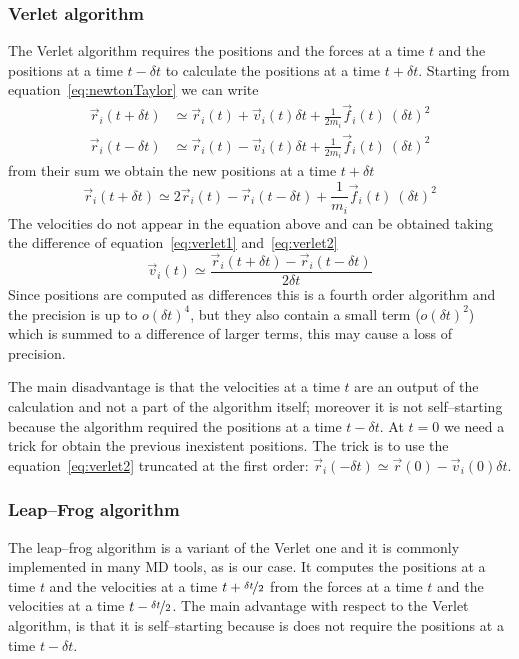 \subsubsection{Verlet algorithm}
The Verlet algorithm requires the positions and the forces at a time $t$ and the positions at a time $t-\delta t$ to calculate the  positions at a time $t+\delta t$. Starting from equation~\eqref{eq:newtonTaylor} we can write
\begin{align}
	\vec r_i(t+\delta t) &\simeq \vec r_i(t) + \vec v_i(t)\delta t + \frac{1}{2m_i}\vec f_i(t)\ (\delta t)^2
	\label{eq:verlet1} \\
	\vec r_i(t-\delta t) &\simeq \vec r_i(t) - \vec v_i(t)\delta t + \frac{1}{2m_i}\vec f_i(t)\ (\delta t)^2
	\label{eq:verlet2}
\end{align}
from their sum we obtain the new positions at a time $t+\delta t$
\begin{equation*}
	\vec r_i(t+\delta t) \simeq 2 \vec r_i(t) - \vec r_i (t - \delta t) + \frac{1}{m_i}\vec f_i(t)\ (\delta t)^2
\end{equation*}
The velocities do not appear in the equation above and can be obtained taking the difference of equation~\eqref{eq:verlet1} and~\eqref{eq:verlet2}
\begin{equation*}
	\vec v_i(t) \simeq \frac{\vec r_i(t+\delta t) - \vec r_i(t-\delta t)}{2\delta t}
\end{equation*}
Since positions are computed as differences this is a fourth order algorithm and the precision is up to $o(\delta t)^4$, but they also contain a small term ($o(\delta t)^2$) which is summed to a difference of larger terms, this may cause a loss of precision.

The main disadvantage is that the velocities at a time $t$ are an output of the calculation and not a part of the algorithm itself; moreover it is not self--starting because the algorithm required the positions at a time $t-\delta t$. At $t=0$ we need a trick for obtain the previous inexistent positions. The trick is to use the equation~\eqref{eq:verlet2} truncated at the first order: $\vec r_i(-\delta t) \simeq \vec r(0) - \vec v_i(0)\delta t$.

\subsubsection{Leap--Frog algorithm}
The leap--frog algorithm is a variant of the Verlet one and it is commonly implemented in many \ac{MD} tools, as is our case. It computes the positions at a time $t$ and the velocities at a time $t+\nicefrac{\delta t}{2}$ from the forces at a time $t$ and the velocities at a time $t-\nicefrac{\delta t}{2}$. The main advantage with respect to the Verlet algorithm, is that it is self--starting because is does not require the positions at a time $t-\delta t$.

